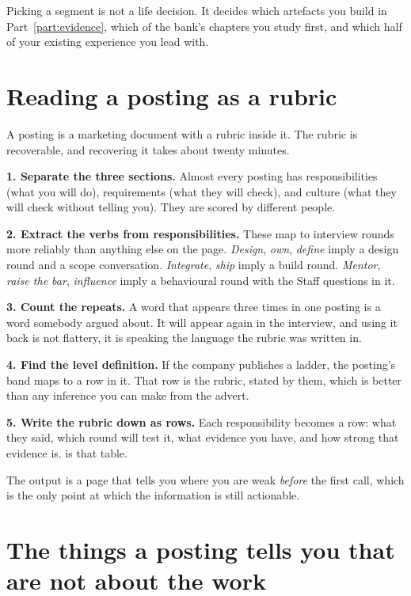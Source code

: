 Picking a segment is not a life decision. It decides which artefacts you build
in Part~\ref{part:evidence}, which of the bank's chapters you study first, and
which half of your existing experience you lead with.

\section{Reading a posting as a rubric}

A posting is a marketing document with a rubric inside it. The rubric is
recoverable, and recovering it takes about twenty minutes.

\begin{kitmethod}
\textbf{1. Separate the three sections.} Almost every posting has responsibilities
(what you will do), requirements (what they will check), and culture (what they
will check without telling you). They are scored by different people.

\textbf{2. Extract the verbs from responsibilities.} These map to interview
rounds more reliably than anything else on the page. \emph{Design}, \emph{own},
\emph{define} imply a design round and a scope conversation. \emph{Integrate},
\emph{ship} imply a build round. \emph{Mentor}, \emph{raise the bar},
\emph{influence} imply a behavioural round with the Staff questions in it.

\textbf{3. Count the repeats.} A word that appears three times in one posting is
a word somebody argued about. It will appear again in the interview, and using
it back is not flattery, it is speaking the language the rubric was written in.

\textbf{4. Find the level definition.} If the company publishes a ladder, the
posting's band maps to a row in it. That row is the rubric, stated by them,
which is better than any inference you can make from the advert.

\textbf{5. Write the rubric down as rows.} Each responsibility becomes a row:
what they said, which round will test it, what evidence you have, and how
strong that evidence is.  is that table.
\end{kitmethod}

The output is a page that tells you where you are weak \emph{before} the first
call, which is the only point at which the information is still actionable.

\section{The things a posting tells you that are not about the work}

